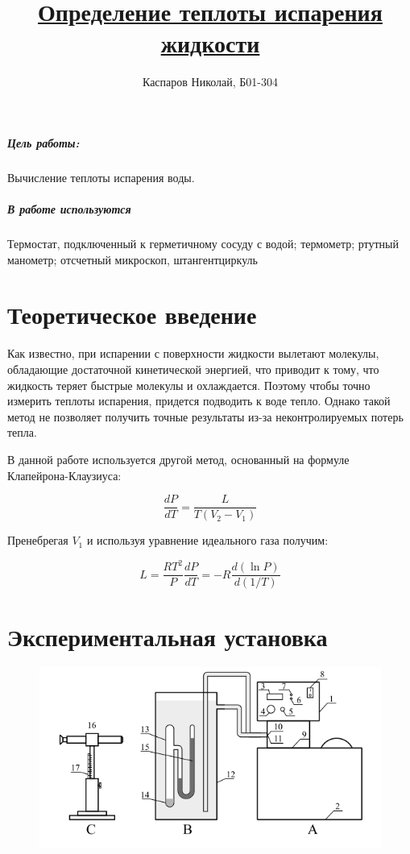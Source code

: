 \documentclass[a4paper]{article}
\title{\underline{Определение теплоты испарения жидкости}}
\author{Каспаров Николай, Б01-304}
\begin{document}
\maketitle
\begin{center}
\Large{\textbf{ }}
\end{center}

\subparagraph{Цель работы:}
Вычисление теплоты испарения воды.

\subparagraph{В работе используются}
Термостат, подключенный к герметичному сосуду с водой; термометр; ртутный манометр;
отсчетный микроскоп, штангентциркуль

\section{Теоретическое введение}

Как известно, при испарении с поверхности жидкости вылетают молекулы,
обладающие достаточной кинетической энергией, что приводит к тому, что
жидкость теряет быстрые молекулы и охлаждается.
Поэтому чтобы точно измерить теплоты испарения, придется подводить к воде тепло.
Однако такой метод не позволяет получить точные результаты из-за неконтролируемых
потерь тепла.

В данной работе используется другой метод, основанный на формуле Клапейрона-Клаузиуса:

\begin{equation}
    \frac{dP}{dT} = \frac{L}{T(V_2 - V_1)}
\end{equation}

Пренебрегая $V_1$ и используя уравнение идеального газа получим:

\begin{equation}
    L = \frac{RT^2}{P} \frac{dP}{dT} = -R \frac{d(\ln{P})}{d(1/T)}
\end{equation}

\section{Экспериментальная установка}

\begin{figure}[h!]
    \centering
    \includegraphics[scale=0.6]{stand.png}
\end{figure}
\end{document}
